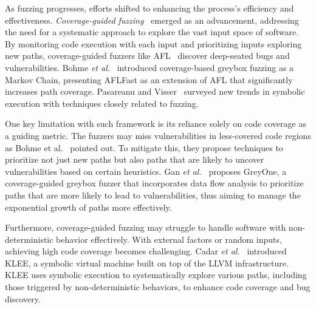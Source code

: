 As fuzzing progresses, efforts shifted to enhancing the process's
efficiency and effectiveness. {\em Coverage-guided fuzzing}~\cite{10.1145/3293882.3339002,AFL,10.1145/3133956.3134020,10.1145/3133956.3138820} emerged as an advancement,
addressing the need for a systematic approach to explore the vast
input space of software. By monitoring code execution with each input
and prioritizing inputs exploring new paths, coverage-guided fuzzers
like AFL~\cite{AFL} discover deep-seated bugs and
vulnerabilities. Bohme {\em et al.}~\cite{10.1145/3133956.3134020} introduced
coverage-based greybox fuzzing as a Markov Chain, presenting AFLFast
as an extension of AFL that significantly increases path
coverage. Pasareanu and Visser~\cite{10.1145/3364452.3364455} surveyed new trends in
symbolic execution with techniques closely related
to fuzzing.



One key limitation with such framework is its reliance solely on code
coverage as a guiding metric. The fuzzers may miss vulnerabilities in
less-covered code regions as Bohme et al.~\cite{10.1145/3133956.3134020} pointed out. To
mitigate this, they propose techniques to prioritize not just new
paths but also paths that are likely to uncover vulnerabilities based
on certain heuristics.
Gan {\em et al.}~\cite{244046} proposes GreyOne, a coverage-guided greybox fuzzer that incorporates data flow analysis to prioritize
paths that are more likely to lead to vulnerabilities, thus aiming to
manage the exponential growth of paths more effectively.

Furthermore, coverage-guided fuzzing may struggle to handle software
with non-deterministic behavior effectively. With external factors or
random inputs, achieving high code coverage becomes challenging.
Cadar {\em et al.}~\cite{10.5555/1855741.1855756} introduced KLEE, a symbolic virtual machine built on top of the LLVM infrastructure. KLEE uses symbolic execution to systematically explore various paths,
including those triggered by non-deterministic behaviors, to enhance
code coverage and bug discovery.


